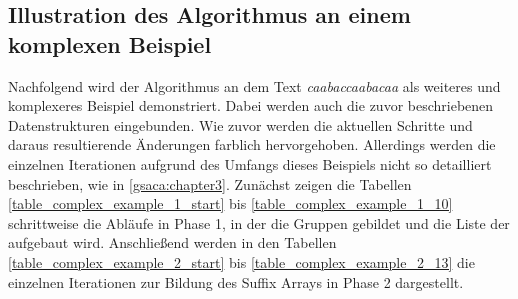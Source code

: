 \newpage
\subsection{Illustration des Algorithmus an einem komplexen Beispiel}
\label{gsaca:chapter6}

Nachfolgend wird der Algorithmus an dem Text \textit{caabaccaabacaa} als weiteres und komplexeres Beispiel demonstriert. 
Dabei werden auch die zuvor beschriebenen Datenstrukturen eingebunden. 
Wie zuvor werden die aktuellen Schritte und daraus resultierende {\"A}nderungen farblich hervorgehoben.
Allerdings werden die einzelnen Iterationen aufgrund des Umfangs dieses Beispiels nicht so detailliert beschrieben, wie in \ref{gsaca:chapter3}.
Zun{\"a}chst zeigen die Tabellen \ref{table_complex_example_1_start} bis \ref{table_complex_example_1_10} schritt\-weise die Abl{\"a}ufe in Phase 1, in der die Gruppen gebildet und die Liste der \prevpointer aufgebaut wird. 
Anschlie{\ss}end werden in den Tabellen \ref{table_complex_example_2_start} bis \ref{table_complex_example_2_13} die einzelnen Iterationen zur Bildung des Suffix Arrays in Phase 2 dargestellt.


